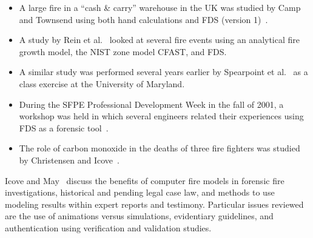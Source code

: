\begin{itemize}
\item A large fire in a ``cash \& carry'' warehouse in the UK was studied by Camp and Townsend using both hand calculations and FDS (version 1)~\cite{Camp:Interflam2001}.
\item A study by Rein et al.~\cite{Rein:Interflam2004} looked at several fire events using an analytical fire growth model, the NIST zone model CFAST, and FDS.
\item A similar study was performed several years earlier by Spearpoint et al.~\cite{Spearpoint:ICFRE3} as a class exercise at the University of Maryland.
\item During the SFPE Professional Development Week in the fall of 2001, a workshop was held in which several engineers related their experiences using FDS as a forensic tool~\cite{Carpenter:SFPE2001}.
\item The role of carbon monoxide in the deaths of three fire fighters was studied by Christensen and Icove~\cite{Christensen:JFS}.
\end{itemize}

Icove and May~\cite{Icove:JNAFE2021} discuss the benefits of computer fire models in forensic fire investigations, historical and pending legal case law, and methods to use modeling results within expert reports and testimony. Particular issues reviewed are the use of animations versus simulations, evidentiary guidelines, and authentication using verification and validation studies.

